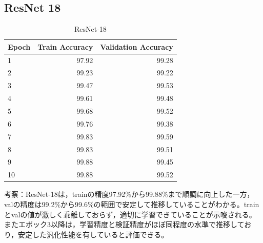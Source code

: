 \documentclass[a4paper,11pt,titlepage]{jsarticle}
\begin{document}
\subsection{ResNet 18}
\begin{table}[H]
\centering
\caption{ResNet-18}
\label{tab:ResNet18}
\begin{tabular}{lrr}
\hline
 Epoch &  Train Accuracy &  Validation Accuracy \\
\hline
     1 &           97.92 &                99.28 \\
     2 &           99.23 &                99.22 \\
     3 &           99.47 &                99.53 \\
     4 &           99.61 &                99.48 \\
     5 &           99.68 &                99.52 \\
     6 &           99.76 &                99.38 \\
     7 &           99.83 &                99.59 \\
     8 &           99.83 &                99.51 \\
     9 &           99.88 &                99.45 \\
    10 &           99.88 &                99.52 \\
\hline
\end{tabular}
\end{table}

考察：ResNet-18は，trainの精度97.92\%から99.88\%まで順調に向上した一方，valの精度は99.2\%から99.6\%の範囲で安定して推移していることがわかる。trainとvalの値が激しく乖離しておらず，適切に学習できていることが示唆される。またエポック3以降は，学習精度と検証精度がほぼ同程度の水準で推移しており，安定した汎化性能を有していると評価できる。
\end{document}
